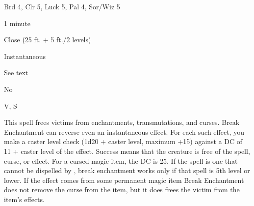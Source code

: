 
\begin{description*}
\item[Level:] Brd 4, Clr 5, Luck 5, Pal 4, Sor/Wiz 5
\item[Casting Time:] 1 minute
\item[Range:] Close (25 ft. + 5 ft./2 levels)
\item[Duration:] Instantaneous
\item[Saving Throw:] See text
\item[Spell Resistance:] No
\item[Components:] V, S
\end{description*}

This spell frees victims from enchantments, transmutations, and curses. Break
Enchantment can reverse even an instantaneous effect. For each such effect, you
make a caster level check (1d20 + caster level, maximum +15) against a DC of 11
+ caster level of the effect. Success means that the creature is free of the spell,
curse, or effect. For a cursed magic item, the DC is 25.
If the spell is one that cannot be dispelled by , break
enchantment works only if that spell is 5th level or lower.
If the effect comes from some permanent magic item Break Enchantment does
not remove the curse from the item, but it does frees the victim from the item's
effects.